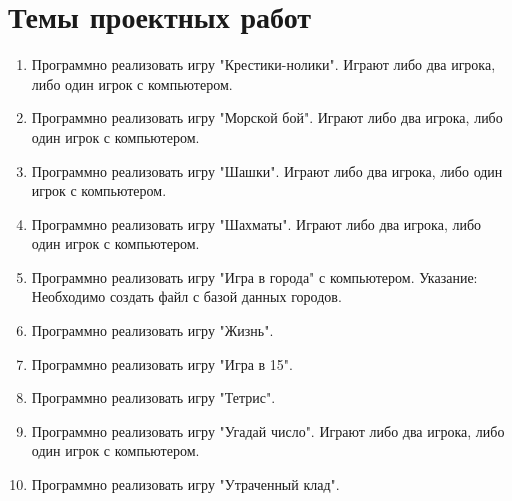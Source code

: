 \chapter*{Темы проектных работ}
\begin{enumerate}[leftmargin=*]
    \item Программно реализовать игру "Крестики-нолики". Играют либо два игрока, либо один игрок с компьютером.
    \item Программно реализовать игру "Морской бой". Играют либо два игрока, либо один игрок с компьютером.
    \item Программно реализовать игру "Шашки". Играют либо два игрока, либо один игрок с компьютером.
    \item Программно реализовать игру "Шахматы". Играют либо два игрока, либо один игрок с компьютером.
    \item Программно реализовать игру "Игра в города" с компьютером. Указание: Необходимо создать файл с базой данных городов.
    \item Программно реализовать игру "Жизнь".
    \item Программно реализовать игру "Игра в 15".
    \item Программно реализовать игру "Тетрис".
    \item Программно реализовать игру "Угадай число". Играют либо два игрока, либо один игрок с компьютером.
    \item Программно реализовать игру "Утраченный клад".
\end{enumerate}
